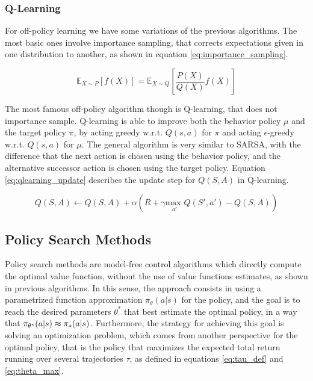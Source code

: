
\subsubsection{Q-Learning}

For off-policy learning we have some variations of the previous algorithms. The most basic ones involve importance sampling, that corrects expectations given in one distribution to another, as shown in equation \ref{eq:importance_sampling}.

\begin{equation}
\mathbb{E}_{X \sim P}[f(X)] = \mathbb{E}_{X \sim Q}\left[\frac{P(X)}{Q(X)}f(X)\right]
\label{eq:importance_sampling}
\end{equation}

The most famous off-policy algorithm though is Q-learning, that does not importance sample. Q-learning is able to improve both the behavior policy $\mu$ and the target policy $\pi$, by acting greedy w.r.t. $Q(s,a)$ for $\pi$ and acting $\epsilon$-greedy w.r.t. $Q(s,a)$ for $\mu$. The general algorithm is very similar to SARSA, with the difference that the next action is chosen using the behavior policy, and the alternative successor action is chosen using the target policy. Equation \ref{eq:qlearning_update} describes the update step for $Q(S,A)$ in Q-learning.

\begin{equation}
Q(S,A) \leftarrow Q(S,A) + \alpha (R + \gamma \underset{a'}{\textrm{max }}Q(S',a') - Q(S,A))
\label{eq:qlearning_update}
\end{equation}

\subsection{Policy Search Methods}

Policy search methods are model-free control algorithms which directly compute the optimal value function, without the use of value functions estimates, as shown in previous algorithms. In this sense, the approach consists in using a parametrized function approximation $\pi_{\theta}(a|s)$ for the policy, and the goal is to reach the desired parameters $\theta^*$ that best estimate the optimal policy, in a way that $\pi_{\theta^*}(a|s) \thickapprox \pi_*(a|s)$. Furthermore, the strategy for achieving this goal is solving an optimization problem, which comes from another perspective for the optimal policy, that is the policy that maximizes the expected total return running over several trajectories $\tau$, as defined in equations \ref{eq:tau_def} and \ref{eq:theta_max}.

